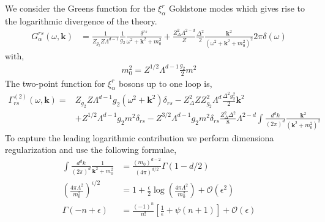 \documentclass[notitlepage,onecolumn,showpacs,11pt]{revtex4-1}
\newcommand{\mbf}[1]{\mathbf{#1}}
\begin{document}
We consider the Greens function for the $\xi^r_\alpha$ Goldstone modes
which gives rise to the logarithmic divergence of the theory.
\begin{equation}
    \begin{aligned}
        G^{rs}_\alpha(\omega,\mbf{k})
        &=
        \frac{1}{Z_{g_2}Z\Lambda^{d-1}}
        \frac{1}{g_2}
        \frac{\delta^{rs}}{\omega^2+\mbf{k}^2+m^2_0}
        +
        \frac{Z_\Delta^2\Lambda^{2-d}}{Z}
        \frac{\Delta^2}{2}
        \frac{\mbf{k}^2}
        {\left(\omega^2+\mbf{k}^2+m_0^2\right)^2}
        2\pi\delta(\omega)
    \end{aligned}
\end{equation}
with,
\begin{equation}
    \begin{aligned}
        m^2_0 = Z^{1/2}\Lambda^{d-1}\frac{g_2}{2}m^2
    \end{aligned}
\end{equation}
The two-point function for $\xi^r_\alpha$ bosons up to one loop is,
\begin{equation}
    \begin{aligned}
        \Gamma^{(2)}_{rs}\left(\omega,\mbf{k}\right)
        =&Z_{g_2}Z\Lambda^{d-1}g_2(\omega^2+\mbf{k}^2)\delta_{rs}
        -
        Z_{\Delta}^2Z Z^2_{g_2}\Lambda^d\frac{\Delta^2g_2^2}{2}
        \mbf{k}^2\\
        &+Z^{1/2}\Lambda^{d-1}g_2m^2\delta_{rs}
        -Z^{3/2}\Lambda^{d-1}g_2m^2\delta_{rs}
        \frac{Z_\Delta^2\Delta^2}{8}
        \Lambda^{2-d}\int \frac{d^dk}{(2\pi)^d}\frac{\mbf{k}^2}
        {\left(\mbf{k}^2+m_0^2\right)^2}
    \end{aligned}
\end{equation}
To capture the leading logarithmic contribution we perform dimensiona
regularization and use the following formulae,
\begin{equation}
    \begin{aligned}
        \int\frac{d^dk}{(2\pi)^d}\frac{1}{\mbf{k}^2+m_0^2}
        &=\frac{(m_0)^{d-2}}{(4\pi)^{d/2}}\Gamma\left(1-d/2\right) \\
        \left(\frac{4\pi\Lambda^2}{m_0^2}\right)^{\epsilon/2}
        &=1+\frac{\epsilon}{2}\log\left(\frac{4\pi\Lambda^2}
        {m_0^2}\right)+\mathcal{O}(\epsilon^2) \\
        \Gamma(-n+\epsilon)
        &=\frac{(-1)^n}{n!}
        \left[\frac{1}{\epsilon}+\psi(n+1)\right]
        +\mathcal{O}(\epsilon)
    \end{aligned}
\end{equation}
\end{document}
